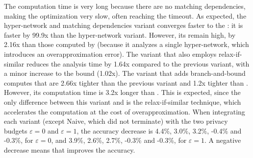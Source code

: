 The computation time is very long because there are no matching dependencies, making the optimization very slow, often reaching the timeout. 
As expected, the hyper-network and matching dependencies variant converges faster to the \propa: it is faster by 99.9x than the hyper-network variant.   
However, its \propa remain high, by 2.16x than those computed by \tool (because it analyzes a single hyper-network, which introduces an overapproximation error). 
The variant that also employs relax-if-similar reduces the analysis time by 1.64x compared to the previous variant, with a minor increase to the bound (1.02x). 
The variant that adds branch-and-bound computes \propa that are 2.66x tighter than the previous variant and 1.2x tighter than \tool. 
However, its computation time is 3.2x longer than \tool. 
This is expected, since the only difference between this variant and \tool is the relax-if-similar technique, which accelerates the computation at the cost of overapproximation. 
When integrating each variant (except Naive, which did not terminate) with the two privacy budgets $\varepsilon=0$ and $\varepsilon=1$, the accuracy decrease is 
4.4\%, 3.0\%, 3.2\%, -0.4\% and -0.3\%, for $\varepsilon=0$, and  
 3.9\%, 2.6\%, 2.7\%, -0.3\% and -0.3\%, for $\varepsilon=1$. 
A negative decrease means that \tool improves the accuracy.

